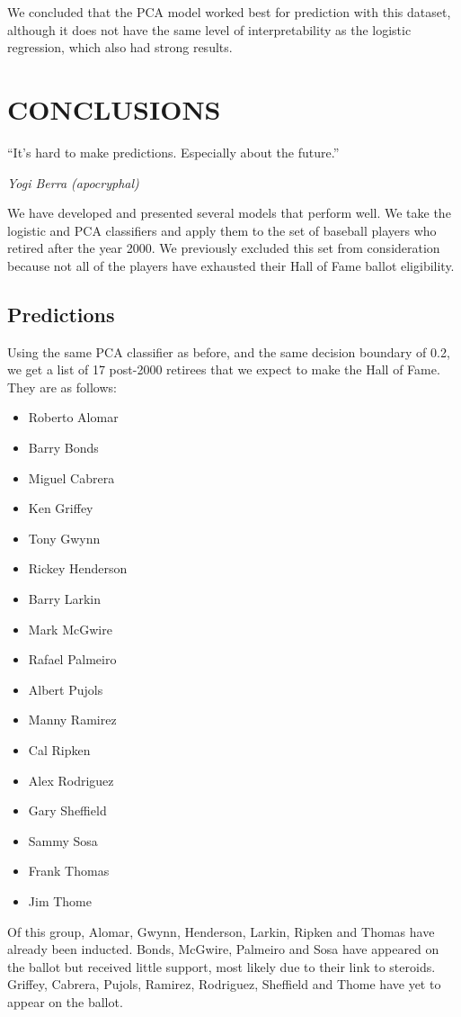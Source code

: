 \documentclass[letterpaper, 10 pt, conference]{ieeeconf}
\begin{document}
We concluded that the PCA model worked best for prediction with this dataset, although it does not have the same level of interpretability as the logistic regression, which also had strong results. 

\section{CONCLUSIONS}

\epigraph{``It's hard to make predictions. Especially about the future.”}{\textit{Yogi Berra (apocryphal)}}

We have developed and presented several models that perform well. We take the logistic and PCA classifiers and apply them to the set of baseball players who retired after the year 2000. We previously excluded this set from consideration because not all of the players have exhausted their Hall of Fame ballot eligibility. 

\subsection{Predictions}
Using the same PCA classifier as before, and the same decision boundary of 0.2, we get a list of 17 post-2000 retirees that we expect to make the Hall of Fame. They are as follows:
\begin{itemize}
\item Roberto Alomar
\item Barry Bonds
\item Miguel Cabrera
\item Ken Griffey
\item Tony Gwynn
\item Rickey Henderson
\item Barry Larkin
\item Mark McGwire
\item Rafael Palmeiro
\item Albert Pujols
\item Manny Ramirez
\item Cal Ripken
\item Alex Rodriguez
\item Gary Sheffield
\item Sammy Sosa
\item Frank Thomas
\item Jim Thome
\end{itemize}

Of this group, Alomar, Gwynn, Henderson, Larkin, Ripken and Thomas have already been inducted. Bonds, McGwire, Palmeiro and Sosa have appeared on the ballot but received little support, most likely due to their link to steroids. Griffey, Cabrera, Pujols, Ramirez, Rodriguez, Sheffield and Thome have yet to appear on the ballot.
\end{document}
